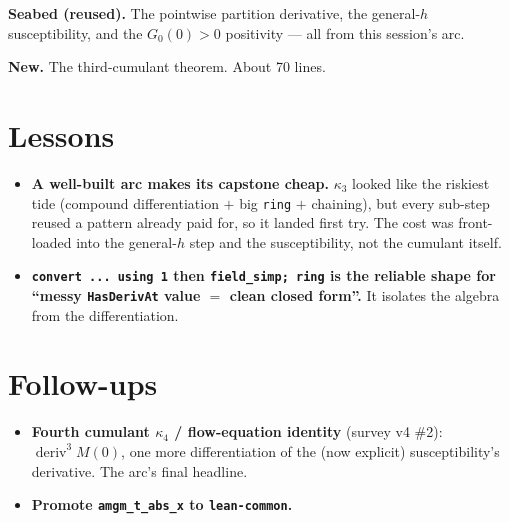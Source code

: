 \documentclass[11pt]{article}
\newcommand{\deriv}{\operatorname{deriv}}
\begin{document}
\textbf{Seabed (reused).} The pointwise partition derivative, the general-$h$
susceptibility, and the $G_0(0)>0$ positivity --- all from this session's arc.

\textbf{New.} The third-cumulant theorem. About 70 lines.

\section{Lessons}

\begin{itemize}[itemsep=3pt]
\item \textbf{A well-built arc makes its capstone cheap.} $\kappa_3$ looked like
  the riskiest tide (compound differentiation $+$ big \texttt{ring} $+$
  chaining), but every sub-step reused a pattern already paid for, so it landed
  first try. The cost was front-loaded into the general-$h$ step and the
  susceptibility, not the cumulant itself.
\item \textbf{\texttt{convert ... using 1} then \texttt{field\_simp; ring} is the
  reliable shape for ``messy \texttt{HasDerivAt} value $=$ clean closed form''.}
  It isolates the algebra from the differentiation.
\end{itemize}

\section{Follow-ups}

\begin{itemize}[itemsep=3pt]
\item \textbf{Fourth cumulant $\kappa_4$ / flow-equation identity} (survey v4
  \#2): $\deriv^3 M(0)$, one more differentiation of the (now explicit)
  susceptibility's derivative. The arc's final headline.
\item \textbf{Promote \texttt{amgm\_t\_abs\_x} to \texttt{lean-common}.}
\end{itemize}
\end{document}
